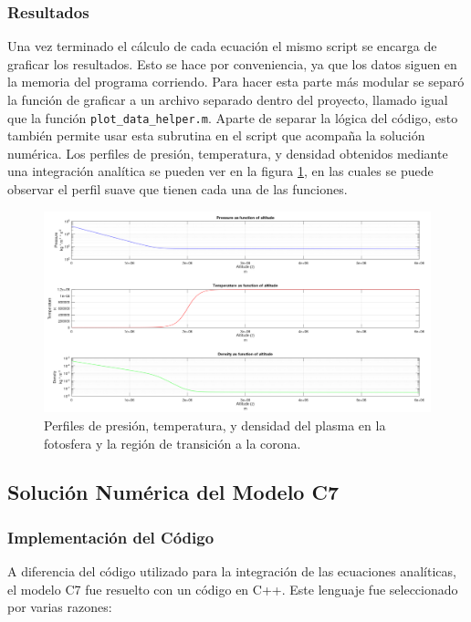 \subsubsection{Resultados}
Una vez terminado el cálculo de cada ecuación el mismo script se encarga de
graficar los resultados. Esto se hace por conveniencia, ya que los datos siguen
en la memoria del programa corriendo. Para hacer esta parte más modular se
separó la función de graficar a un archivo separado dentro del proyecto, llamado
igual que la función \verb|plot_data_helper.m|. Aparte de separar la lógica del
código, esto también permite usar esta subrutina en el script que acompaña la
solución numérica. Los perfiles de presión, temperatura, y densidad obtenidos
mediante una integración analítica se pueden ver en la figura
\ref{modeloAnaliticoResultadosGraficas}, en las cuales se puede observar el
perfil suave que tienen cada una de las funciones. 

\begin{figure}[!ht]
	\centering
	\includegraphics[scale=0.3]{Figuras/IntegracionAnaliticaGrafica.png}
	\caption{Perfiles de presión, temperatura, y densidad del plasma en la fotosfera y la región de transición a la corona.}
	\label{modeloAnaliticoResultadosGraficas}
\end{figure}

\subsection{Solución Numérica del Modelo C7}

\subsubsection{Implementación del Código}
A diferencia del código utilizado para la integración de las ecuaciones
analíticas, el modelo C7 fue resuelto con un código en C++. Este lenguaje fue
seleccionado por varias razones:

